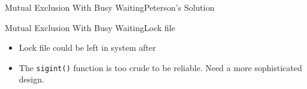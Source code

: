 \begin{frame}{Mutual Exclusion With Busy Waiting}{Peterson's Solution}
  \begin{center}
  \end{center}
  \begin{refsection}
    \nocite{wiki:peterson}
    \printbibliography[heading=none]
  \end{refsection}
\end{frame}

\begin{frame}{Mutual Exclusion With Busy Waiting}{Lock file}
  \begin{itemize}
  \item[\Bad] Lock file could be left in system after \Cc
  \end{itemize}
\end{frame}

\begin{frame}{\wrong}
\end{frame}

\begin{itemize}
\item The \texttt{sigint()} function is too crude to be reliable. Need a more sophisticated design.
\end{itemize}

